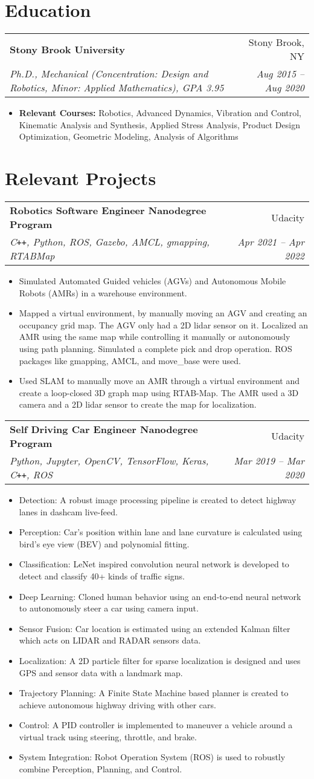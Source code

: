 \documentclass[letterpaper,10pt]{article}
\makeatletter
\newcommand{\resumeHeading}[4]{
  \vspace{-1pt}
    \begin{tabular*}{0.97\textwidth}{l@{\extracolsep{\fill}}r}
      \textbf{#1} & #2 \vspace{-2pt}\\ \vspace{1pt}
      \textit{\small#3} & \textit{\small #4} \\
    \end{tabular*}
}
\newcommand{\resumeSection}[1]{
\vspace{-12pt}
\section{\textbf{#1}}
}
\newcommand{\resumeItemListStart}{
\vspace{-6pt}
\begin{itemize}[leftmargin=14pt]
}
\newcommand{\resumeItemListEnd}{
\vspace{+6pt}
\end{itemize}
}
\newcommand{\resumeItem}[1]{
  \item\small{
      {#1 \vspace{-7pt}
      }
  }
}
\makeatother
\begin{document}
\resumeSection{Education}
\resumeHeading
{Stony Brook University}{Stony Brook, NY}
{Ph.D., Mechanical (Concentration: Design and Robotics, Minor: Applied Mathematics), GPA 3.95}{Aug 2015 -- Aug 2020}
\resumeItemListStart
\resumeItem{\textbf{Relevant Courses:} Robotics, Advanced Dynamics, Vibration and Control, Kinematic Analysis and Synthesis,  Applied Stress Analysis, Product Design Optimization, Geometric Modeling, Analysis of Algorithms}
\resumeItemListEnd



\resumeSection{Relevant Projects}
    
    \resumeHeading{Robotics Software Engineer Nanodegree Program}{Udacity}{C\texttt{++}, Python, ROS, Gazebo, AMCL, gmapping, RTABMap}{Apr 2021 -- Apr 2022}
    \resumeItemListStart
    \resumeItem{Simulated Automated Guided vehicles (AGVs) and Autonomous Mobile Robots (AMRs) in a warehouse environment.}
    \resumeItem{Mapped a virtual environment, by manually moving an AGV and creating an occupancy grid map. The AGV only had a 2D lidar sensor on it. Localized an AMR using the same map while controlling it manually or autonomously using path planning. Simulated a complete pick and drop operation. ROS packages like gmapping, AMCL, and move\_base were used.}
    \resumeItem{Used SLAM to manually move an AMR through a virtual environment and create a loop-closed 3D graph map using RTAB-Map. The AMR used a 3D camera and a 2D lidar sensor to create the map for localization.}
    \resumeItemListEnd
    
    \resumeHeading{Self Driving Car Engineer Nanodegree Program}{Udacity}{Python, Jupyter, OpenCV, TensorFlow, Keras, C\texttt{++}, ROS}{Mar 2019 -- Mar 2020}
    \resumeItemListStart
    \resumeItem{Detection: A robust image processing pipeline is created to detect highway lanes in dashcam live-feed.}
    \resumeItem{Perception: Car's position within lane and lane curvature is calculated using bird's eye view (BEV) and polynomial fitting.}
    \resumeItem{Classification: LeNet inspired convolution neural network is developed to detect and classify 40+ kinds of traffic signs.}
    \resumeItem{Deep Learning: Cloned human behavior using an end-to-end neural network to autonomously steer a car using camera input.}
    \resumeItem{Sensor Fusion: Car location is estimated using an extended Kalman filter which acts on LIDAR and RADAR sensors data.}
    \resumeItem{Localization: A 2D particle filter for sparse localization is designed and uses GPS and sensor data with a landmark map.}
    \resumeItem{Trajectory Planning: A Finite State Machine based planner is created to achieve autonomous highway driving with other cars.}
    \resumeItem{Control: A PID controller is implemented to maneuver a vehicle around a virtual track using steering, throttle, and brake.}
    \resumeItem{System Integration: Robot Operation System (ROS) is used to robustly combine Perception, Planning, and Control.}
    \resumeItemListEnd
\end{document}
